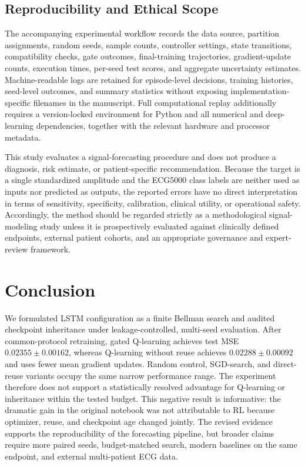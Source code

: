 \documentclass[conference]{IEEEtran}
\begin{document}
\subsection{Reproducibility and Ethical Scope}
The accompanying experimental workflow records the data source, partition assignments, random seeds, sample counts, controller settings, state transitions, compatibility checks, gate outcomes, final-training trajectories, gradient-update counts, execution times, per-seed test scores, and aggregate uncertainty estimates. Machine-readable logs are retained for episode-level decisions, training histories, seed-level outcomes, and summary statistics without exposing implementation-specific filenames in the manuscript. Full computational replay additionally requires a version-locked environment for Python and all numerical and deep-learning dependencies, together with the relevant hardware and processor metadata.

This study evaluates a signal-forecasting procedure and does not produce a diagnosis, risk estimate, or patient-specific recommendation. Because the target is a single standardized amplitude and the ECG5000 class labels are neither used as inputs nor predicted as outputs, the reported errors have no direct interpretation in terms of sensitivity, specificity, calibration, clinical utility, or operational safety. Accordingly, the method should be regarded strictly as a methodological signal-modeling study unless it is prospectively evaluated against clinically defined endpoints, external patient cohorts, and an appropriate governance and expert-review framework.

\section{Conclusion}
We formulated LSTM configuration as a finite Bellman search and audited checkpoint inheritance under leakage-controlled, multi-seed evaluation. After common-protocol retraining, gated Q-learning achieves test MSE $0.02355\pm0.00162$, whereas Q-learning without reuse achieves $0.02288\pm0.00092$ and uses fewer mean gradient updates. Random control, SGD-search, and direct-reuse variants occupy the same narrow performance range. The experiment therefore does not support a statistically resolved advantage for Q-learning or inheritance within the tested budget. This negative result is informative: the dramatic gain in the original notebook was not attributable to RL because optimizer, reuse, and checkpoint age changed jointly. The revised evidence supports the reproducibility of the forecasting pipeline, but broader claims require more paired seeds, budget-matched search, modern baselines on the same endpoint, and external multi-patient ECG data.



\end{document}
